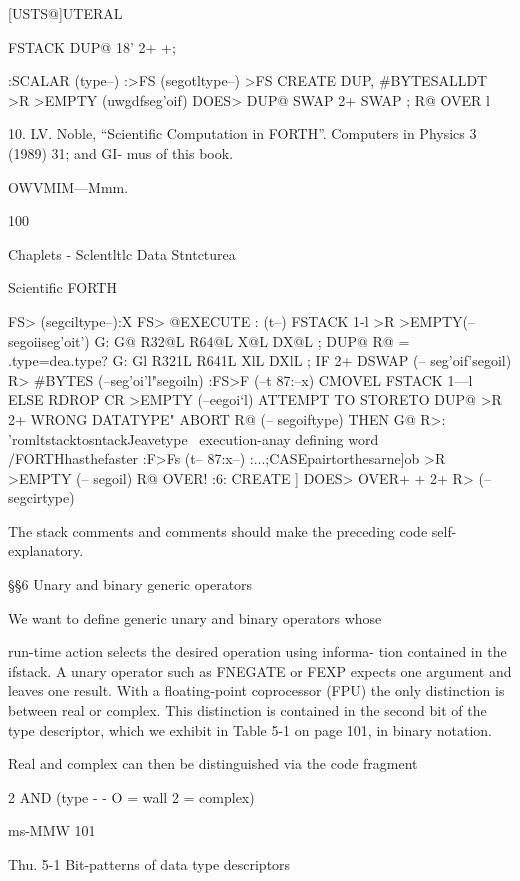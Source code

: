 [USTS@]UTERAL

\ddlnesodarandscalars FSTACK DUP@ 18' 2+ +;

:SCALAR (type--) :>FS (segotltype--) \myzx >FS
CREATE DUP, #BYTESALLDT >R >EMPTY (uwgdfseg'oif)
DOES> DUP@ SWAP 2+ SWAP ; R@ OVER l \storetypeonlstack

10. LV. Noble, “Scientific Computation in FORTH”. Computers in Physics 3 (1989) 31; and
GI- mus of this book.

OWVMIM—Mmm.

100

Chaplets - Sclentltlc Data Stntcturea

Scientific FORTH

FS> (segciltype--)\aay:X FS> @EXECUTE : (t--)
FSTACK 1-l \decllstackptr
>R >EMPTY(-- segoiiseg'oit') G: G@ R32@L R64@L X@L DX@L ;
DUP@ R@ = \srce.type=dea.type? G: Gl R321L R641L XlL DXlL ;
IF 2+ DSWAP (-- seg'oif'segoil) \movedatatromliatacktoflromFPU
R> #BYTES (--seg'oi'l"segoiln) :FS>F (--t 87:--x)
CMOVEL \movedatairomltstack FSTACK 1—l \declatackptr
ELSE RDROP CR >EMPTY (--eegoi‘l)
ATTEMPT TO STORETO DUP@ >R 2+
WRONG DATATYPE" ABORT R@ (-- segoiftype)
THEN G@ R>:
\movedatal'romltstacktosntackJeavetype
\ execution-anay defining word
\HS/FORTHhasthefaster :F>Fs (t-- 87:x--)
\CASE:...;CASEpairtorthesarne]ob >R >EMPTY (-- segoil)
R@ OVER!
:6: CREATE ] DOES> OVER+ + 2+ R> (--segcirtype)

 

The stack comments and comments should make the preceding
code self-explanatory.

§§6 Unary and binary generic operators

We want to define generic unary and binary operators whose

run-time action selects the desired operation using informa-
tion contained in the ifstack. A unary operator such as FNEGATE
or FEXP expects one argument and leaves one result. With a
floating-point coprocessor (FPU) the only distinction is between
real or complex. This distinction is contained in the second bit of
the type descriptor, which we exhibit in Table 5-1 on page 101,
in binary notation.

Real and complex can then be distinguished via the code fragment

2 AND (type - - O = wall 2 = complex)

ms-MMW 101

Thu. 5-1 Bit-patterns of data type descriptors

 

